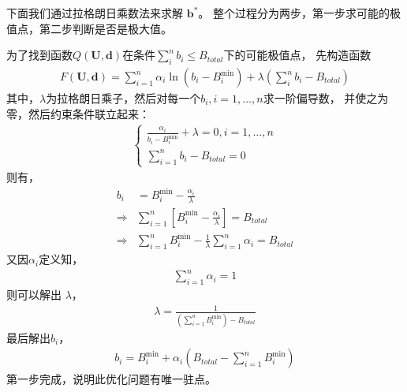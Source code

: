 下面我们通过拉格朗日乘数法来求解 $\mathbf{b}^*$。
整个过程分为两步，第一步求可能的极值点，第二步判断是否是极大值。

为了找到函数$Q(\mathbf{U}, \mathbf{d})$在条件$\sum_i^n b_i \le B_{total}$下的可能极值点，
先构造函数
\begin{align*}
    F(\mathbf{U}, \mathbf{d}) =  \sum_{i=1}^n  \alpha_i \ln \left(b_i - B_i^{\min} \right)
    + \lambda(\sum_i^n b_i - B_{total} ) 
\end{align*}
其中，$\lambda$为拉格朗日乘子，然后对每一个$b_i, i=1,\dots,n$求一阶偏导数，
并使之为零，然后约束条件联立起来：
\begin{align}   
    \begin{cases}
        \displaystyle\frac{\alpha_i}{b_i - B_i^{\min}} + \lambda = 0, i=1,\dots, n  \\
        \displaystyle \sum_{i=1}^n b_i - B_{total} = 0
    \end{cases}
\end{align}
则有，
\begin{align*}
    b_i &= B_i^{\min} - \frac{\alpha_i}{\lambda} \\
    \Rightarrow & \sum_{i=1}^n \left[ B_i^{\min} - \frac{\alpha_i}{\lambda} \right] = B_{total} \\
    \Rightarrow & \sum_{i=1}^n B_i^{\min} - \frac{1}{\lambda} \sum_{i=1}^n \alpha_i = B_{total}
\end{align*}
又因$\alpha_i$定义知，
\begin{align*}
    \sum_{i=1}^n \alpha_i = 1
\end{align*}
则可以解出 $\lambda$，
\begin{align*}
    \lambda = \frac{1}{(\sum_{i=1}^n B_i^{\min} )  -B_{total} }
\end{align*}
最后解出$b_i$，
\begin{align}
    b_i = B_i^{\min} + \alpha_i \left( B_{total} - \sum_{i=1}^n B_i^{\min}  \right)
    \label{eqn:chap_nash:res_allocation}
\end{align}
第一步完成，说明此优化问题有唯一驻点。

